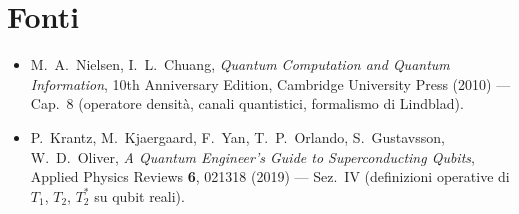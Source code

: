 \documentclass[11pt,a4paper]{article}
\begin{document}
\section{Fonti}

\begin{itemize}
\item M.~A.~Nielsen, I.~L.~Chuang, \emph{Quantum Computation and Quantum Information}, 10th Anniversary Edition, Cambridge University Press (2010) — Cap.~8 (operatore densità, canali quantistici, formalismo di Lindblad).
\item P.~Krantz, M.~Kjaergaard, F.~Yan, T.~P.~Orlando, S.~Gustavsson, W.~D.~Oliver, \emph{A Quantum Engineer's Guide to Superconducting Qubits}, Applied Physics Reviews \textbf{6}, 021318 (2019) — Sez.~IV (definizioni operative di $T_1$, $T_2$, $T_2^*$ su qubit reali).
\end{itemize}
\end{document}
